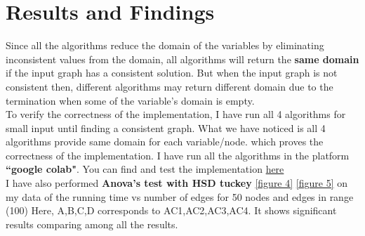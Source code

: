 \documentclass[12pt , conference]{IEEEtran}
\begin{document}
\section{Results and Findings}	
	\noindent
	Since all the algorithms reduce the domain of the variables by eliminating inconsistent values from the domain, all algorithms will return the \textbf{same domain} if the input graph has a consistent solution. But when the input graph is not consistent then, different algorithms may return different domain due to the termination when some of the variable's domain is empty.\\To verify the correctness of the implementation, I have run all 4 algorithms for small input until finding a consistent graph. What we have noticed is all 4 algorithms provide same domain for each variable/node. which proves the correctness of the implementation. I have run all the algorithms in the platform \textbf{``google colab"}. You can find and test the implementation \href{https://tinyurl.com/solutionAC-040}{here}\\I have also performed \textbf{Anova's test with HSD tuckey} \ref{figure 4} \ref{figure 5} on my data of the running time vs number of edges for 50 nodes and edges in range (100) Here, A,B,C,D corresponds to AC1,AC2,AC3,AC4. It shows significant results comparing among all the results. 
	
	
	 
	
	
\end{document}
